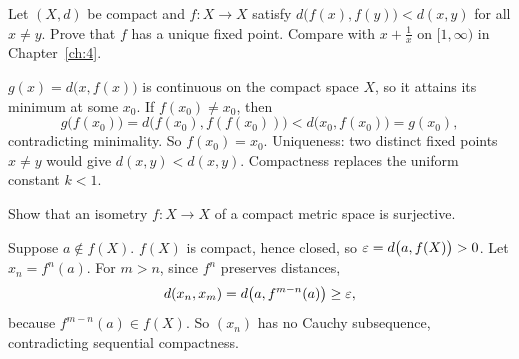 \begin{exercise}\hard
Let $(X,d)$ be compact and $f\colon X\to X$ satisfy $d\bigl(f(x),f(y)\bigr)<d(x,y)$ for all $x\ne y$. Prove that $f$ has a unique fixed point. Compare with $x+\frac1x$ on $[1,\infty)$ in Chapter~\ref{ch:4}.
\end{exercise}
\begin{solution}
$g(x)=d\bigl(x,f(x)\bigr)$ is continuous on the compact space $X$, so it attains its minimum at some $x_0$. If $f(x_0)\ne x_0$, then
\[ g\bigl(f(x_0)\bigr)=d\bigl(f(x_0),f(f(x_0))\bigr)<d\bigl(x_0,f(x_0)\bigr)=g(x_0), \]
contradicting minimality. So $f(x_0)=x_0$. Uniqueness: two distinct fixed points $x\ne y$ would give $d(x,y)<d(x,y)$. Compactness replaces the uniform constant $k<1$.
\end{solution}

\begin{exercise}\hard
Show that an isometry $f\colon X\to X$ of a compact metric space is surjective.
\end{exercise}
\begin{solution}
Suppose $a\notin f(X)$. $f(X)$ is compact, hence closed, so $\varepsilon=d\bigl(a,f(X)\bigr)>0$. Let $x_n=f^n(a)$. For $m>n$, since $f^n$ preserves distances,
\[ d(x_n,x_m)=d\bigl(a,f^{m-n}(a)\bigr)\ge\varepsilon, \]
because $f^{m-n}(a)\in f(X)$. So $(x_n)$ has no Cauchy subsequence, contradicting sequential compactness.
\end{solution}
